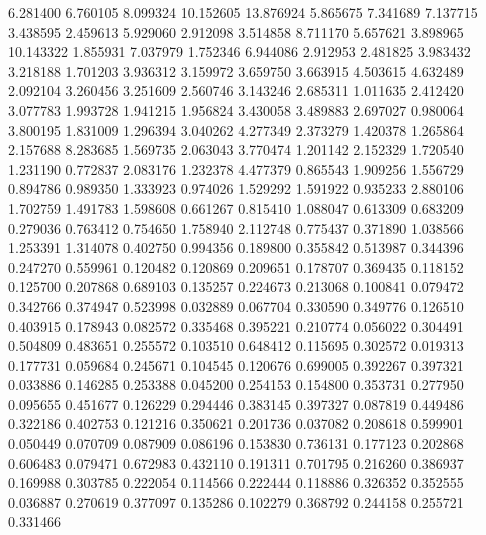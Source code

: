 6.281400
6.760105
8.099324
10.152605
13.876924
5.865675
7.341689
7.137715
3.438595
2.459613
5.929060
2.912098
3.514858
8.711170
5.657621
3.898965
10.143322
1.855931
7.037979
1.752346
6.944086
2.912953
2.481825
3.983432
3.218188
1.701203
3.936312
3.159972
3.659750
3.663915
4.503615
4.632489
2.092104
3.260456
3.251609
2.560746
3.143246
2.685311
1.011635
2.412420
3.077783
1.993728
1.941215
1.956824
3.430058
3.489883
2.697027
0.980064
3.800195
1.831009
1.296394
3.040262
4.277349
2.373279
1.420378
1.265864
2.157688
8.283685
1.569735
2.063043
3.770474
1.201142
2.152329
1.720540
1.231190
0.772837
2.083176
1.232378
4.477379
0.865543
1.909256
1.556729
0.894786
0.989350
1.333923
0.974026
1.529292
1.591922
0.935233
2.880106
1.702759
1.491783
1.598608
0.661267
0.815410
1.088047
0.613309
0.683209
0.279036
0.763412
0.754650
1.758940
2.112748
0.775437
0.371890
1.038566
1.253391
1.314078
0.402750
0.994356
0.189800
0.355842
0.513987
0.344396
0.247270
0.559961
0.120482
0.120869
0.209651
0.178707
0.369435
0.118152
0.125700
0.207868
0.689103
0.135257
0.224673
0.213068
0.100841
0.079472
0.342766
0.374947
0.523998
0.032889
0.067704
0.330590
0.349776
0.126510
0.403915
0.178943
0.082572
0.335468
0.395221
0.210774
0.056022
0.304491
0.504809
0.483651
0.255572
0.103510
0.648412
0.115695
0.302572
0.019313
0.177731
0.059684
0.245671
0.104545
0.120676
0.699005
0.392267
0.397321
0.033886
0.146285
0.253388
0.045200
0.254153
0.154800
0.353731
0.277950
0.095655
0.451677
0.126229
0.294446
0.383145
0.397327
0.087819
0.449486
0.322186
0.402753
0.121216
0.350621
0.201736
0.037082
0.208618
0.599901
0.050449
0.070709
0.087909
0.086196
0.153830
0.736131
0.177123
0.202868
0.606483
0.079471
0.672983
0.432110
0.191311
0.701795
0.216260
0.386937
0.169988
0.303785
0.222054
0.114566
0.222444
0.118886
0.326352
0.352555
0.036887
0.270619
0.377097
0.135286
0.102279
0.368792
0.244158
0.255721
0.331466
